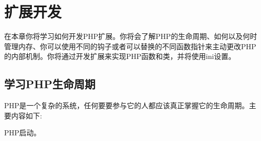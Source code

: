 \chapter{扩展开发}

在本章你将学习如何开发PHP扩展。你将会了解PHP的生命周期、如何以及何时管理内存、你可以使用不同的钩子或者可以替换的不同函数指针来主动更改PHP的内部机制。你将通过开发扩展来实现PHP函数和类，并将使用ini设置。

\section{学习PHP生命周期}
\label{sec:php_lifecycle}

PHP是一个复杂的系统，任何要要参与它的人都应该真正掌握它的生命周期。主要内容如下:

PHP启动。


